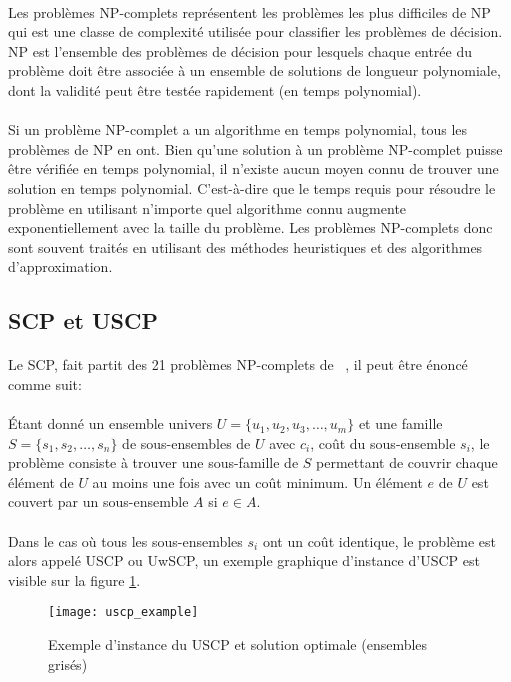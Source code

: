 \documentclass[a4paper,11pt,twoside,french,report]{../common/simplem}
\begin{document}
				\paragraph*{}
					Les problèmes \acrshort{NP}-complets représentent les problèmes les plus difficiles de \acrfull{NP} qui est une classe de complexité utilisée pour classifier les problèmes de décision. \acrshort{NP} est l'ensemble des problèmes de décision pour lesquels chaque entrée du problème doit être associée à un ensemble de solutions de longueur polynomiale, dont la validité peut être testée rapidement (en temps polynomial).
				\paragraph*{}
					Si un problème \acrshort{NP}-complet a un algorithme en temps polynomial, tous les problèmes de \acrshort{NP} en ont. Bien qu'une solution à un problème \acrshort{NP}-complet puisse être vérifiée en temps polynomial, il n'existe aucun moyen connu de trouver une solution en temps polynomial. C'est-à-dire que le temps requis pour résoudre le problème en utilisant n'importe quel algorithme connu augmente exponentiellement avec la taille du problème. Les problèmes \acrshort{NP}-complets donc sont souvent traités en utilisant des méthodes heuristiques et des algorithmes d'approximation.
			\subsection{\acrshort{SCP} et \acrshort{USCP}}\label{sec:SCP_et_USCP}
				\paragraph*{}
					Le \gls{SCP}, fait partit des 21 problèmes \acrshort{NP}-complets de \citeauthor{Karp1972}~\cite{Karp1972}, il peut être énoncé comme suit:
				\paragraph*{}
					Étant donné un ensemble univers \(U = \{u_1, u_2, u_3, \dots, u_m\}\) et une famille \(S = \{s_1, s_2, \dots, s_n\}\) de sous-ensembles de \(U\) avec \(c_i\), coût du sous-ensemble \(s_i\), le problème consiste à trouver une sous-famille de \(S\) permettant de couvrir chaque élément de \(U\) au moins une fois avec un coût minimum. Un élément \(e\) de \(U\) est couvert par un sous-ensemble \(A\) si \(e \in A\).
				\paragraph*{}
					Dans le cas où tous les sous-ensembles \(s_i\) ont un coût identique, le problème est alors appelé \gls{USCP} ou \gls{UwSCP}, un exemple graphique d'instance d'\gls{USCP} est visible sur la figure \ref{fig:uscp_example}.
				\begin{figure}[H]
					\centering%
					\texttt{[image: uscp\_example]}%
					\caption{Exemple d'instance du \acrshort{USCP} et solution optimale (ensembles grisés)~\cite{Mount2017}}%
					\label{fig:uscp_example}%
				\end{figure}
\end{document}
